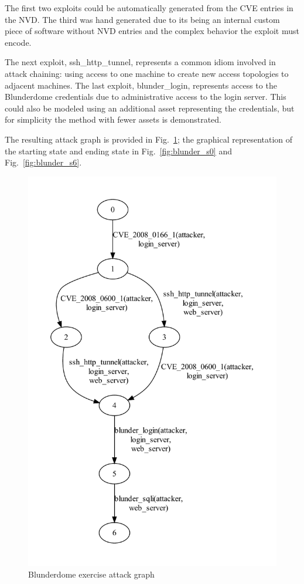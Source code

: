 The first two exploits could be automatically generated from the CVE entries
in the NVD. The third was hand generated due to its being an internal custom 
piece of software without NVD entries and the complex behavior the exploit must
encode.

The next exploit, ssh_http_tunnel, represents a common idiom involved in
attack chaining: using access to one machine to create new access topologies
to adjacent machines. The last exploit, blunder_login, represents access to
the Blunderdome credentials due to administrative access to the login
server. This could also be modeled using an additional asset representing the
credentials, but for simplicity the method with fewer assets is demonstrated.

The resulting attack graph is provided in Fig.~\ref{fig:blunder_ag}; the
graphical representation of the starting state and ending state in 
Fig.~\ref{fig:blunder_s0} and Fig.~\ref{fig:blunder_s6}.

\begin{figure}
\includegraphics[width=5in]{ag_blunderdome/ag_depth5}
\caption{Blunderdome exercise attack graph}
\label{fig:blunder_ag}
\end{figure}

